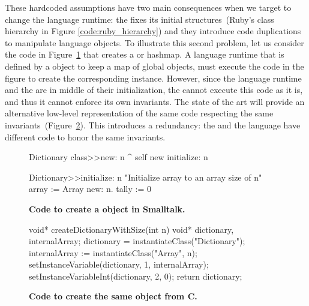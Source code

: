 These hardcoded \VM assumptions have two main consequences when we target to change the language runtime: the \VM fixes its initial structures~(\eg Ruby's class hierarchy in Figure \ref{code:ruby_hierarchy}) and they introduce code duplications to manipulate language objects.
To illustrate this second problem, let us consider the code in Figure~\ref{code:logic_dup} that creates a  or hashmap. A language runtime that is defined by a  object to keep \eg a map of global objects, must execute the code in the figure to create the corresponding instance. However, since the language runtime and the \VM are in middle of their initialization, the \VM cannot execute this code as it is, and thus it cannot enforce its own invariants. The state of the art \VMs will provide an alternative low-level representation of the same code respecting the same invariants~(Figure~\ref{code:logic_dup2}). This introduces a redundancy: the \VM and the language have different code to honor the same invariants.

\begin{figure}[ht]
\begin{code}
Dictionary class>>new: n
    ^ self new initialize: n

Dictionary>>initialize: n
    "Initialize array to an array size of n"
    array := Array new: n.
    tally := 0
\end{code}
\caption{\textbf{Code to create a  object in Smalltalk.}\label{code:logic_dup}}
\end{figure}

\begin{figure}[ht]
\begin{code}
void* createDictionaryWithSize(int n){
    void* dictionary, internalArray;
    dictionary = instantiateClass("Dictionary");
    internalArray := instantiateClass("Array", n);
    setInstanceVariable(dictionary, 1, internalArray);
    setInstanceVariableInt(dictionary, 2, 0);
    return dictionary;
}
\end{code}
\caption{\textbf{Code to create the same  object from C.}\label{code:logic_dup2}}
\end{figure}



